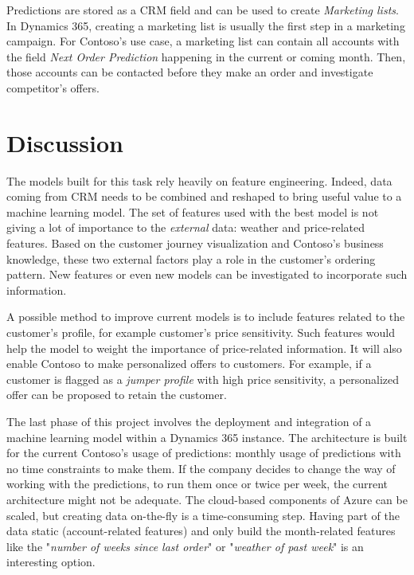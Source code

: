 Predictions are stored as a CRM field and can be used to create \textit{Marketing lists}. In Dynamics 365, creating a marketing list is usually the first step in a marketing campaign. For Contoso's use case, a marketing list can contain all accounts with the field \textit{Next Order Prediction} happening in the current or coming month. Then, those accounts can be contacted before they make an order and investigate competitor's offers.


\section{Discussion} \label{sec:use-case-further-work}
The models built for this task rely heavily on feature engineering. Indeed, data coming from CRM needs to be combined and reshaped to bring useful value to a machine learning model. The set of features used with the best model is not giving a lot of importance to the \textit{external} data: weather and price-related features. Based on the customer journey visualization and Contoso's business knowledge, these two external factors play a role in the customer's ordering pattern. New features or even new models can be investigated to incorporate such information.

A possible method to improve current models is to include features related to the customer's profile, for example customer's price sensitivity. Such features would help the model to weight the importance of price-related information. It will also enable Contoso to make personalized offers to customers. For example, if a customer is flagged as a \textit{jumper profile} with high price sensitivity, a personalized offer can be proposed to retain the customer.

The last phase of this project involves the deployment and integration of a machine learning model within a Dynamics 365 instance. The architecture is built for the current Contoso's usage of predictions: monthly usage of predictions with no time constraints to make them. If the company decides to change the way of working with the predictions, to run them once or twice per week, the current architecture might not be adequate. The cloud-based components of Azure can be scaled, but creating data on-the-fly is a time-consuming step. Having part of the data static (account-related features) and only build the month-related features like the "\textit{number of weeks since last order}" or "\textit{weather of past week}" is an interesting option.


